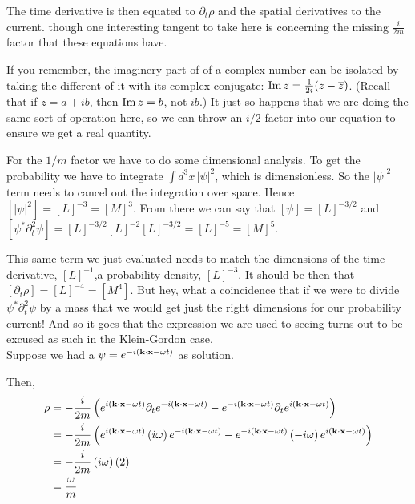 The time derivative is then equated to $\partial_t \rho$ and the spatial derivatives to the current.
though one interesting tangent to take here is concerning the missing $\frac{i}{2m}$ factor that
these equations have.

If you remember, the imaginery part of of a complex number can be isolated by taking the different of it with its
complex conjugate: $\operatorname{Im}{z} = \frac{1}{2i}(z - \overline{z})$. (Recall that if $z = a +ib$, then $\operatorname{Im}{z} = b$, not $ib$.)
It just so happens that we are doing the same sort of operation here, so we can throw an $i/2$ factor into our equation
to ensure we get a real quantity.

For the $1/m$ factor we have to do some dimensional analysis.
To get the probability we have to integrate $\int d^3x \, |\psi|^2$, which is dimensionless.
So the $|\psi|^2$ term needs to cancel out the integration over space.
Hence $[|\psi|^2] = [L]^{-3} = [M]^{3}$.
From there we can say that $[\psi] = [L]^{-3/2}$ and
$[\psi^* \partial_{t}^2 \psi] = [L]^{-3/2}[L]^{-2}[L]^{-3/2} = [L]^{-5} = [M]^{5}$.

This same term we just evaluated needs to match the dimensions of
the time derivative, $[L]^{-1}$,a probability density, $[L]^{-3}$.
It should be then that $[\partial_t \rho] = [L]^{-4} = [M^4]$.
But hey, what a coincidence that if we were to divide $\psi^* \partial_{t}^2 \psi$ by a mass
that we would get just the right dimensions for our probability current!
And so it goes that the expression we are used to seeing turns out to be excused as such in the Klein-Gordon case.
\\


Suppose we had a $\psi =  e^{-i(\boldsymbol{\mathbf{k}}\cdot\boldsymbol{\mathbf{x}} -\omega t)}$ as solution.

Then,
\begin{align*}
\rho &=
    -\frac{i}{2m} \left( 
        e^{i(\boldsymbol{\mathbf{k}}\cdot\boldsymbol{\mathbf{x}} -\omega t)} \partial_t e^{-i(\boldsymbol{\mathbf{k}}\cdot\boldsymbol{\mathbf{x}} -\omega t)} -
        e^{-i(\boldsymbol{\mathbf{k}}\cdot\boldsymbol{\mathbf{x}} -\omega t)} \partial_t e^{i(\boldsymbol{\mathbf{k}}\cdot\boldsymbol{\mathbf{x}} -\omega t)} 
    \right) \\
&= -\frac{i}{2m} \left(
    e^{i(\boldsymbol{\mathbf{k}}\cdot\boldsymbol{\mathbf{x}} -\omega t)} \left(i\omega\right) e^{-i(\boldsymbol{\mathbf{k}}\cdot\boldsymbol{\mathbf{x}} -\omega t)} -
    e^{-i(\boldsymbol{\mathbf{k}}\cdot\boldsymbol{\mathbf{x}} -\omega t)} \left(-i\omega\right) e^{i(\boldsymbol{\mathbf{k}}\cdot\boldsymbol{\mathbf{x}} -\omega t)}
    \right) \\
&= -\frac{i}{2m} \left(i\omega\right) \left( 2 \right) \\
&= \frac{\omega}{m}
\end{align*}

